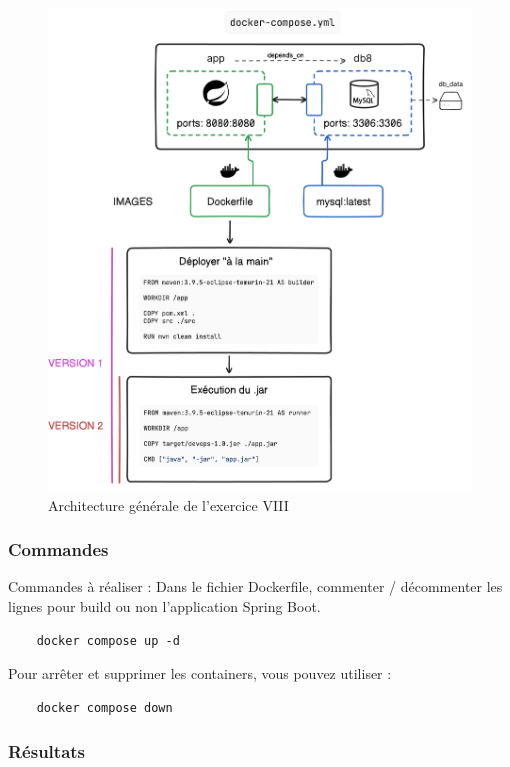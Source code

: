 \begin{figure}[hbtp]
    \centering
    \includegraphics[width=\textwidth]{images/exo8.png}
    \caption{Architecture générale de l'exercice VIII}
    \label{fig:exo8}
\end{figure}

\subsubsection*{Commandes}
Commandes à réaliser :
Dans le fichier Dockerfile, commenter / décommenter les lignes
pour build ou non l'application Spring Boot.
    
\begin{verbatim}
    docker compose up -d
\end{verbatim}
Pour arrêter et supprimer les containers, vous pouvez utiliser :

\begin{verbatim}
    docker compose down
\end{verbatim}

\subsubsection*{Résultats}

